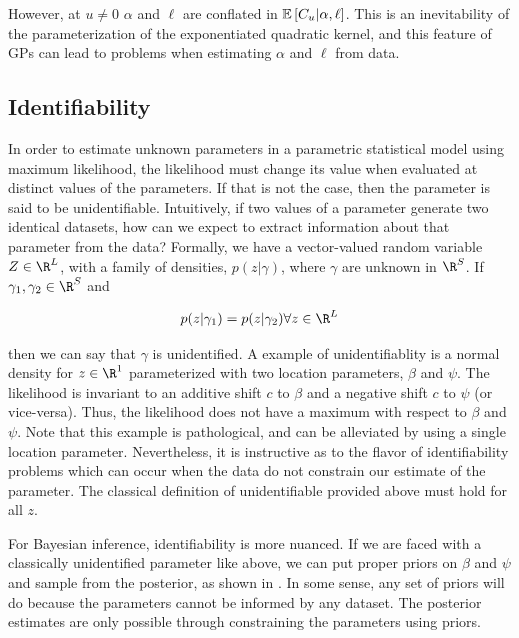 \documentclass{article}
\newcommand{\Exp}[1]{\ensuremath{\mathbb{E} \lb #1 \rb}}
\newcommand{\lb}{\ensuremath{\left[}}
\newcommand{\rb}{\ensuremath{\right]}}
\begin{document}
However, at $u \neq 0$ $\alpha$ and $\ell$ are conflated in $\Exp{C_u | \alpha,
\ell}$.  This is an inevitability of the parameterization of the exponentiated
quadratic kernel, and this feature of GPs can lead to problems when 
estimating $\alpha$ and $\ell$ from data.

\subsection{Identifiability}

In order to estimate unknown parameters in a parametric statistical model using
maximum likelihood, the likelihood must change its value when evaluated at
distinct values of the parameters. If that is not the case, then the parameter
is said to be unidentifiable. Intuitively, if two values of a parameter
generate two identical datasets, how can we expect to extract information about
that parameter from the data? Formally, we have a vector-valued random variable
$Z \in \R^L$, with a family of densities, $p(z | \gamma)$, where $\gamma$ are
unknown in $\R^S$. If $\gamma_1, \gamma_2 \in \R^S$ and 

\begin{align*}
  p(z | \gamma_1) = p(z | \gamma_2) \forall z \in \R^L
\end{align*}

then we can say that $\gamma$ is unidentified. A example of unidentifiablity is
a normal density for $z \in \R^1$ parameterized with two location parameters,
$\beta$ and $\psi$. The likelihood is invariant to an additive shift $c$ to
$\beta$ and a negative shift $c$ to $\psi$ (or vice-versa). Thus, the
likelihood does not have a maximum with respect to $\beta$ and $\psi$. Note
that this example is pathological, and can be alleviated by using a single
location parameter.  Nevertheless, it is instructive as to the flavor of
identifiability problems which can occur when the data do not constrain our
estimate of the parameter. The classical definition of unidentifiable provided
above must hold for all $z$. 

For Bayesian inference, identifiability is more nuanced. If we are faced with a
classically unidentified parameter like above, we can put proper priors on
$\beta$ and $\psi$ and sample from the posterior, as shown in
\cite{xie2004note}. In some sense, any set of priors will do because the
parameters cannot be informed by any dataset. The posterior estimates
are only possible through constraining the parameters using priors. 
\end{document}
